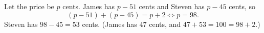 Let the price be $p$ cents. James has $p-51$ cents and Steven has $p-45$ cents, so
\[(p-51)+(p-45)=p+2\iff p=98 .\]
Steven has $98-45=\boxed{53}$ cents. (James has $47$ cents, and $47+53=100=98+2$.)

